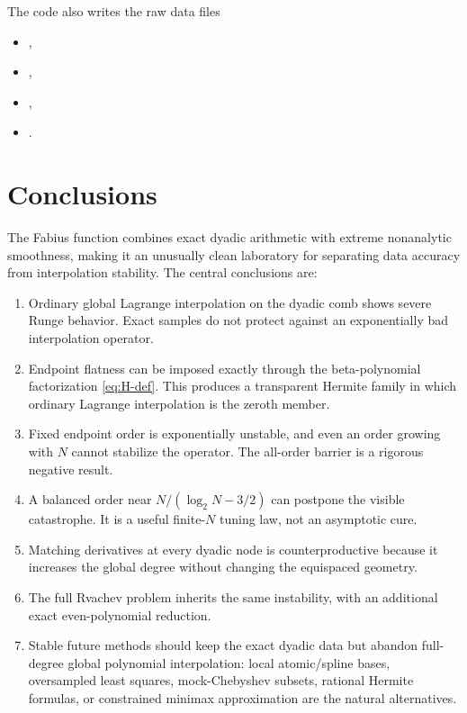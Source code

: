 \documentclass[11pt,oneside]{article}
\theoremstyle{definition}
\theoremstyle{remark}
\begin{document}
The code also writes the raw data files
\begin{itemize}[leftmargin=2em]
\item {},
\item {},
\item {},
\item {}.
\end{itemize}

\section{Conclusions}
\label{sec:conclusions}

The Fabius function combines exact dyadic arithmetic with extreme nonanalytic smoothness, making it an unusually clean laboratory for separating data accuracy from interpolation stability.  The central conclusions are:
\begin{enumerate}[leftmargin=2em]
\item Ordinary global Lagrange interpolation on the dyadic comb shows severe Runge behavior.  Exact samples do not protect against an exponentially bad interpolation operator.
\item Endpoint flatness can be imposed exactly through the beta-polynomial factorization \eqref{eq:H-def}.  This produces a transparent Hermite family in which ordinary Lagrange interpolation is the zeroth member.
\item Fixed endpoint order is exponentially unstable, and even an order growing with $N$ cannot stabilize the operator.  The all-order barrier is a rigorous negative result.
\item A balanced order near $N/(\log_2N-3/2)$ can postpone the visible catastrophe.  It is a useful finite-$N$ tuning law, not an asymptotic cure.
\item Matching derivatives at every dyadic node is counterproductive because it increases the global degree without changing the equispaced geometry.
\item The full Rvachev problem inherits the same instability, with an additional exact even-polynomial reduction.
\item Stable future methods should keep the exact dyadic data but abandon full-degree global polynomial interpolation: local atomic/spline bases, oversampled least squares, mock-Chebyshev subsets, rational Hermite formulas, or constrained minimax approximation are the natural alternatives.
\end{enumerate}
\end{document}
